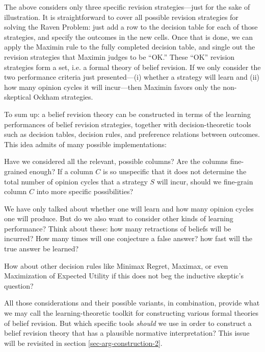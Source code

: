 The above considers only three specific revision strategies---just for the sake of illustration. It is straightforward to cover all possible revision strategies for solving the Raven Problem: just add a row to the decision table for each of those strategies, and specify the outcomes in the new cells. Once that is done, we can apply the Maximin rule to the fully completed decision table, and single out the revision strategies that Maximin judges to be ``OK.'' These ``OK'' revision strategies form a set, i.e. a formal theory of belief revision. If we only consider the two performance criteria just presented---(i) whether a strategy will learn and (ii) how many opinion cycles it will incur---then Maximin favors only the non-skeptical Ockham strategies.

To sum up: a belief revision theory can be constructed in terms of the learning performances of belief revision strategies, together with decision-theoretic tools such as decision tables, decision rules, and preference relations between outcomes. This idea admits of many possible implementations: \op

	
		Have we considered all the relevant, possible columns? Are the columns fine-grained enough? If a column $C$ is so unspecific that it does not determine the total number of opinion cycles that a strategy $S$ will incur, should we fine-grain column $C$ into more specific possibilities?

	
		We have only talked about whether one will learn and how many opinion cycles one will produce. But do we also want to consider other kinds of learning performance? Think about these: how many retractions of beliefs will be incurred? How many times will one conjecture a false answer? how fast will the true answer be learned?

	
		How about other decision rules like Minimax Regret, Maximax, or even Maximization of Expected Utility if this does not beg the inductive skeptic's question? 

\ed All those considerations and their possible variants, in combination, provide what we may call the learning-theoretic toolkit for constructing various formal theories of belief revision. But which specific tools {\em should} we use in order to construct a belief revision theory that has a plausible normative interpretation? This issue will be revisited in section \ref{sec-arg-construction-2}.

